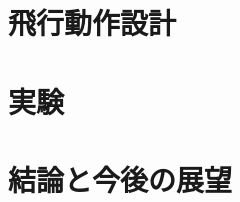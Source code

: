 \documentclass{jarticle}
\begin{document}
\section{飛行動作設計}

\section{実験}

\section{結論と今後の展望}

\footnotesize





\normalsize
\end{document}
